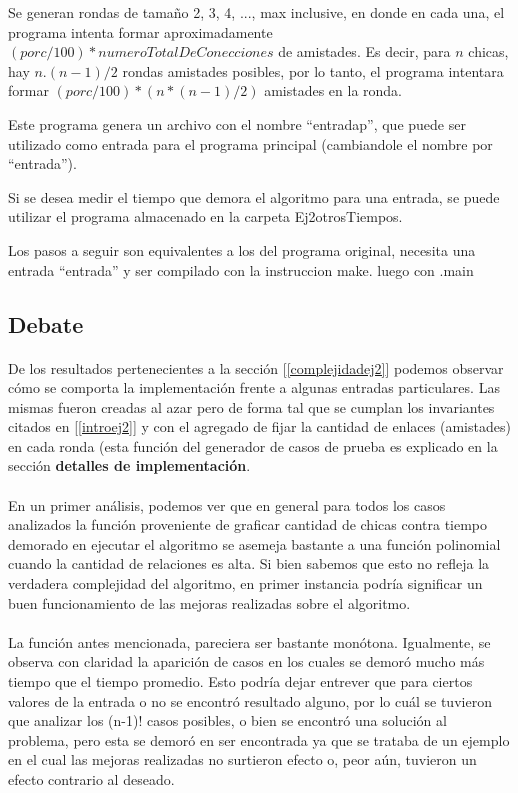 Se generan rondas de tamaño 2, 3, 4, ..., max inclusive, en donde en cada una, el programa intenta formar aproximadamente $(porc/100)*numeroTotalDeConecciones$ de amistades. Es decir, para $n$ chicas, hay $n$.$(n-1)/2$ rondas amistades posibles, por lo tanto, el programa intentara formar $(porc/100)*(n*(n-1)/2)$ amistades en la ronda.

Este programa genera un archivo con el nombre ``entradap'', que puede ser utilizado como entrada para el programa principal (cambiandole el nombre por ``entrada'').


Si se desea medir el tiempo que demora el algoritmo para una entrada, se puede utilizar el programa almacenado en la carpeta Ej2\/otros\/Tiempos.

Los pasos a seguir son equivalentes a los del programa original, necesita una entrada ``entrada'' y ser compilado con la instruccion make. 
luego con .\/main 



\subsection{Debate}
\paragraph{}
De los resultados pertenecientes a la sección [\ref{complejidadej2}] podemos observar cómo se comporta la implementación frente a algunas entradas particulares. Las mismas fueron creadas al azar pero de forma tal que se cumplan los invariantes citados en [\ref{introej2}] y con el agregado de fijar la cantidad de enlaces (amistades) en cada ronda (esta función del generador de casos de prueba es explicado en la sección \textbf{detalles de implementación}.


\paragraph{}
En un primer análisis, podemos ver que en general para todos los casos analizados la función proveniente de graficar cantidad de chicas contra tiempo demorado en ejecutar el algoritmo se asemeja bastante a una función polinomial cuando la cantidad de relaciones es alta. Si bien sabemos que esto no refleja la verdadera complejidad del algoritmo, en primer instancia podría significar un buen funcionamiento de las mejoras realizadas sobre el algoritmo.

\paragraph{}
La función antes mencionada, pareciera ser bastante monótona. Igualmente, se observa con claridad la aparición de casos en los cuales se demoró mucho más tiempo que el tiempo promedio. Esto podría dejar entrever que para ciertos valores de la entrada o no se encontró resultado alguno, por lo cuál se tuvieron que analizar los (n-1)! casos posibles, o bien se encontró una solución al problema, pero esta se demoró en ser encontrada ya que se trataba de un ejemplo en el cual las mejoras realizadas no surtieron efecto o, peor aún, tuvieron un efecto contrario al deseado.


